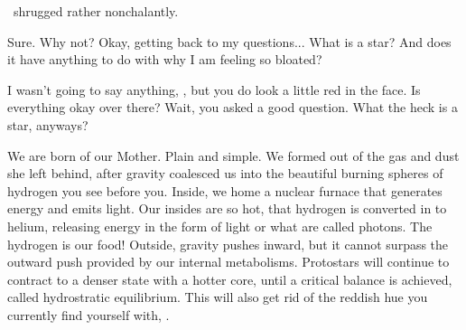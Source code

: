 \documentclass[main.tex]{subfiles}
\begin{document}
\par \nar \rmsterope~shrugged rather nonchalantly.

\par \Sterope Sure.   Why not?   Okay, getting back to my questions...  What is a star?  And does it have anything to do with why I am feeling so bloated?

\par \Alcyone I wasn't going to say anything, \rmsterope, but you do look a little red in the face.  Is everything okay over there?  Wait, you asked a good question.  What the heck is a star, anyways?%

\par \Maia We are born of our Mother.  Plain and simple.  We formed out of the gas and dust she left behind, after gravity coalesced us into the beautiful burning spheres of hydrogen you see before you.  Inside, we home a nuclear furnace that generates energy and emits light.  Our insides are so hot, that hydrogen is converted in to helium, releasing energy in the form of light or what are called photons.  The hydrogen is our food!  Outside, gravity pushes inward, but it cannot surpass the outward push provided by our internal metabolisms.  Protostars will continue to contract to a denser state with a hotter core, until a critical balance is achieved, called hydrostratic equilibrium.  This will also get rid of the reddish hue you currently find yourself with, \rmsterope.

\end{document}

